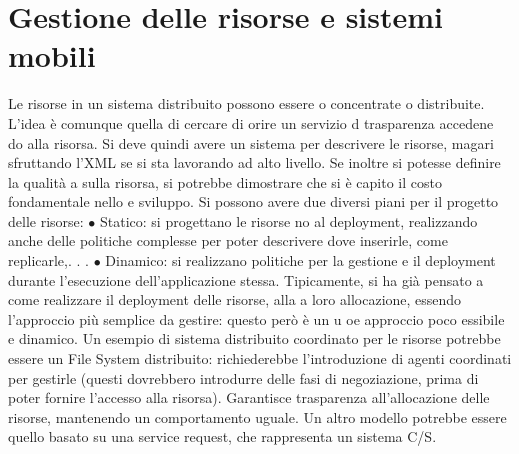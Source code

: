 \section{Gestione delle risorse e sistemi mobili}
Le risorse in un sistema distribuito possono essere o concentrate o distribuite.
L'idea è comunque quella di cercare di orire un servizio d trasparenza accedene
do alla risorsa.
Si deve quindi avere un sistema per descrivere le risorse, magari sfruttando
l'XML se si sta lavorando ad alto livello. Se inoltre si potesse definire la qualità
a
sulla risorsa, si potrebbe dimostrare che si è capito il costo fondamentale nello
e
sviluppo.
Si possono avere due diversi piani per il progetto delle risorse:
$\bullet$ Statico: si progettano le risorse no al deployment, realizzando anche delle
politiche complesse per poter descrivere dove inserirle, come replicarle,. . .
$\bullet$ Dinamico: si realizzano politiche per la gestione e il deployment durante
l'esecuzione dell'applicazione stessa.
Tipicamente, si ha già pensato a come realizzare il deployment delle risorse, alla
a
loro allocazione, essendo l'approccio più semplice da gestire: questo però è un
u
oe
approccio poco essibile e dinamico.
Un esempio di sistema distribuito coordinato per le risorse potrebbe essere
un File System distribuito: richiederebbe l'introduzione di agenti coordinati per
gestirle (questi dovrebbero introdurre delle fasi di negoziazione, prima di poter
fornire l'accesso alla risorsa). Garantisce trasparenza all'allocazione delle risorse,
mantenendo un comportamento uguale. Un altro modello potrebbe essere quello
basato su una service request, che rappresenta un sistema C/S.
